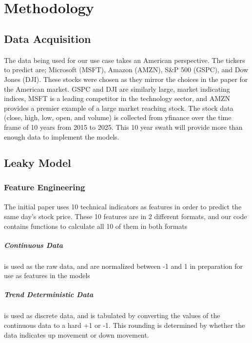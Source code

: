 \documentclass[11pt]{article}
\begin{document}
	\section{Methodology}
	
		\subsection{Data Acquisition}
		
			\paragraph{} The data being used for our use case takes an American perspective. The tickers to predict are; Microsoft (MSFT), Amazon (AMZN), S\&P 500 (GSPC), and Dow Jones (DJI). These stocks were chosen as they mirror the choices in the paper for the American market. GSPC and DJI are similarly large, market indicating indices, MSFT is a leading competitor in the technology sector, and AMZN provides a premier example of a large market reaching stock. The stock data (close, high, low, open, and volume) is collected from yfinance over the time frame of 10 years from 2015 to 2025. This 10 year swath will provide more than enough data to implement the models.
		
		\subsection{Leaky Model}
		
			\subsubsection{Feature Engineering}
		
				\paragraph{} The initial paper uses 10 technical indicators as features in order to predict the same day's stock price. These 10 features are in 2 different formats, and our code contains functions to calculate all 10 of them in both formats
			
					\subparagraph{Continuous Data} is used as the raw data, and are normalized between -1 and 1 in preparation for use as features in the models
				
					\subparagraph{Trend Deterministic Data} is used as discrete data, and is tabulated by converting the values of the continuous data to a hard +1 or -1. This rounding is determined by whether the data indicates up movement or down movement.
			
\end{document}
